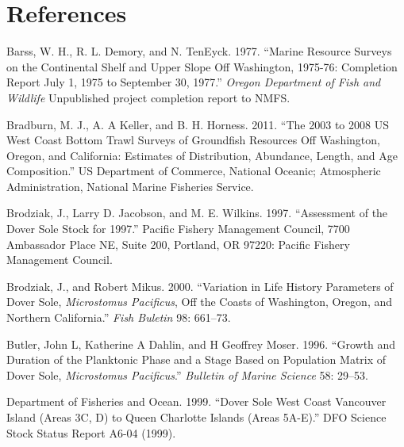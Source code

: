 \documentclass[11pt,
  english,
  a4paper,
]{article}
\begin{document}
\clearpage


\hypertarget{references}{%
\section{References}\label{references}}

\leavevmode\tagmcend\tagstructend


\hypertarget{refs}{}
\begin{cslreferences}
\leavevmode\hypertarget{ref-barss_marine_1977}{}%
Barss, W. H., R. L. Demory, and N. TenEyck. 1977. ``Marine Resource Surveys on the Continental Shelf and Upper Slope Off Washington, 1975-76: Completion Report July 1, 1975 to September 30, 1977.'' \emph{Oregon Department of Fish and Wildlife} Unpublished project completion report to NMFS.

\leavevmode\hypertarget{ref-bradburn_2003_2011}{}%
Bradburn, M. J., A. A Keller, and B. H. Horness. 2011. ``The 2003 to 2008 US West Coast Bottom Trawl Surveys of Groundfish Resources Off Washington, Oregon, and California: Estimates of Distribution, Abundance, Length, and Age Composition.'' US Department of Commerce, National Oceanic; Atmospheric Administration, National Marine Fisheries Service.

\leavevmode\hypertarget{ref-brodziak_assessment_1997}{}%
Brodziak, J., Larry D. Jacobson, and M. E. Wilkins. 1997. ``Assessment of the Dover Sole Stock for 1997.'' Pacific Fishery Management Council, 7700 Ambassador Place NE, Suite 200, Portland, OR 97220: Pacific Fishery Management Council.

\leavevmode\hypertarget{ref-brodziak_variation_2000}{}%
Brodziak, J., and Robert Mikus. 2000. ``Variation in Life History Parameters of Dover Sole, \emph{Microstomus Pacificus}, Off the Coasts of Washington, Oregon, and Northern California.'' \emph{Fish Buletin} 98: 661--73.

\leavevmode\hypertarget{ref-butler_growth_1996}{}%
Butler, John L, Katherine A Dahlin, and H Geoffrey Moser. 1996. ``Growth and Duration of the Planktonic Phase and a Stage Based on Population Matrix of Dover Sole, \emph{Microstomus Pacificus}.'' \emph{Bulletin of Marine Science} 58: 29--53.

\leavevmode\hypertarget{ref-department_of_fisheries_and_ocean_dover_1999}{}%
Department of Fisheries and Ocean. 1999. ``Dover Sole West Coast Vancouver Island (Areas 3C, D) to Queen Charlotte Islands (Areas 5A-E).'' DFO Science Stock Status Report A6-04 (1999).


\end{cslreferences}
\end{document}
